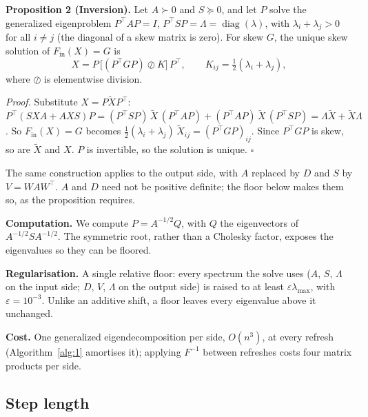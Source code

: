 \documentclass{article}
\begin{document}
\textbf{Proposition 2 (Inversion).} Let \(A \succ 0\) and \(S \succeq 0\), and let \(P\) solve the generalized
eigenproblem \(P^\top A P = I\), \(P^\top S P = \Lambda = \operatorname{diag}(\lambda)\), with \(\lambda_i + \lambda_j > 0\)
for all \(i \neq j\) (the diagonal of a skew matrix is zero). For skew \(G\), the unique skew solution of \(F_{\mathrm{in}}(X) = G\) is
\[X = P\, \big[ (P^\top G P) \oslash K \big]\, P^\top, \qquad K_{ij} = \tfrac12(\lambda_i + \lambda_j),\]
where \(\oslash\) is elementwise division.

\emph{Proof.} Substitute \(X = P\tilde X P^\top\):
\(P^\top (SXA + AXS) P = (P^\top S P)\, \tilde X\, (P^\top A P) + (P^\top A P)\, \tilde X\, (P^\top S P) = \Lambda \tilde X + \tilde X \Lambda\).
So \(F_{\mathrm{in}}(X) = G\) becomes \(\tfrac12(\lambda_i + \lambda_j)\, \tilde X_{ij} = (P^\top G P)_{ij}\). Since
\(P^\top G P\) is skew, so are \(\tilde X\) and \(X\). \(P\) is invertible, so the solution is unique. \(\square\)

The same construction applies to the output side, with \(A\) replaced by \(D\) and \(S\) by \(V = WAW^\top\).
\(A\) and \(D\) need not be positive definite; the floor below makes them so, as the proposition requires.

\textbf{Computation.} We compute \(P = A^{-1/2} Q\), with \(Q\) the eigenvectors of \(A^{-1/2} S A^{-1/2}\). The
symmetric root, rather than a Cholesky factor, exposes the eigenvalues so they can be floored.

\textbf{Regularisation.} A single relative floor: every spectrum the solve uses (\(A\), \(S\), \(\Lambda\) on the
input side; \(D\), \(V\), \(\Lambda\) on the output side) is raised to at least \(\varepsilon \lambda_{\max}\), with
\(\varepsilon = 10^{-3}\). Unlike an additive shift, a floor leaves every eigenvalue above it unchanged.

\textbf{Cost.} One generalized eigendecomposition per side, \(O(n^3)\), at every refresh (Algorithm~\ref{alg:1} amortises it); applying
\(F^{-1}\) between refreshes costs four matrix products per side.

\subsection{Step length}\label{sec:length}
\end{document}
